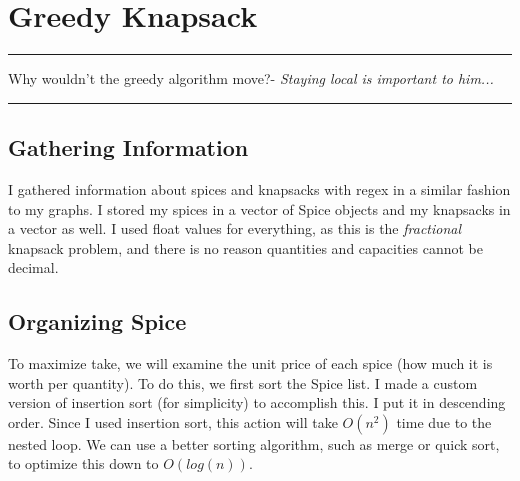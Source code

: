 \documentclass[letterpaper, 10pt]{article}
\begin{document}
\newpage
\section{Greedy Knapsack}
\hrule
\vspace{.25cm}
Why wouldn't the greedy algorithm move?- \textit{Staying local is important to him...}\\
\hrule
\vspace{.25cm}
\subsection{Gathering Information}
I gathered information about spices and knapsacks with regex in a similar fashion to my graphs. I stored my spices in a vector of Spice objects and my knapsacks in a vector as well. I used float values for everything, as this is the \textit{fractional} knapsack problem, and there is no reason quantities and capacities cannot be decimal. 



\subsection{Organizing Spice}
To maximize take, we will examine the unit price of each spice (how much it is worth per quantity). To do this, we first sort the Spice list. I made a custom version of insertion sort (for simplicity) to accomplish this. I put it in descending order. Since I used insertion sort, this action will take $O(n^2)$ time due to the nested loop. We can use a better sorting algorithm, such as merge or quick sort, to optimize this down to $O(log(n))$.

\newpage
\end{document}
